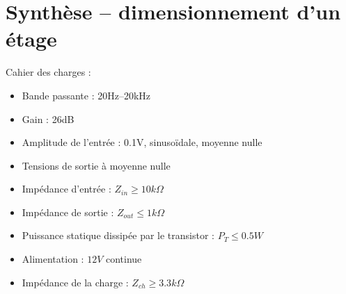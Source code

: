 \documentclass{../template/tp}
\begin{document}
\section{Synthèse -- dimensionnement d'un étage}
Cahier des charges :
\begin{itemize}
\item Bande passante : 20Hz--20kHz
\item Gain : 26dB
\item Amplitude de l'entrée : 0.1V, sinusoïdale, moyenne nulle
\item Tensions de sortie à moyenne nulle
\item Impédance d'entrée : $Z_{in}\geq10k\Omega$
\item Impédance de sortie : $Z_{out}\leq 1k\Omega$
\item Puissance statique dissipée par le transistor : $P_T\leq 0.5W$
\item Alimentation : $12V$ continue
\item Impédance de la charge : $Z_{ch}\geq 3.3k\Omega$
\end{itemize}
~\\
\end{document}
